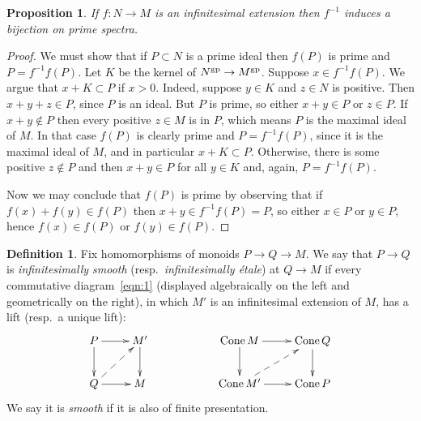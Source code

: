 \documentclass[12pt]{amsart}
\newtheorem{proposition}[theorem]{Proposition}
\theoremstyle{definition}
\newtheorem{definition}[theorem]{Definition}
\theoremstyle{remark}
\def\Cone{\operatorname{Cone}}
\begin{document}
\begin{proposition} \label{prop:spectra}
If $f : N \to M$ is an infinitesimal extension then $f^{-1}$ induces a bijection on prime spectra.
\end{proposition}
\begin{proof}
We must show that if $P \subset N$ is a prime ideal then $f(P)$ is prime and $P = f^{-1} f(P)$.  Let $K$ be the kernel of $N^{\rm gp} \to M^{\rm gp}$.  Suppose $x \in f^{-1} f(P)$.  We argue that $x + K \subset P$ if $x > 0$.  Indeed, suppose $y \in K$ and $z \in N$ is positive.  Then $x + y + z \in P$, since $P$ is an ideal.  But $P$ is prime, so either $x + y \in P$ or $z \in P$.  If $x + y \not\in P$ then every positive $z \in M$ is in $P$, which means $P$ is the maximal ideal of $M$.  In that case $f(P)$ is clearly prime and $P = f^{-1} f(P)$, since it is the maximal ideal of $M$, and in particular $x + K \subset P$.  Otherwise, there is some positive $z \not\in P$ and then $x + y \in P$ for all $y \in K$ and, again, $P = f^{-1} f(P)$.

Now we may conclude that $f(P)$ is prime by observing that if $f(x) + f(y) \in f(P)$ then $x + y \in f^{-1} f(P) = P$, so either $x \in P$ or $y \in P$, hence $f(x) \in f(P)$ or $f(y) \in f(P)$.
\end{proof}

\begin{definition}
Fix homomorphisms of monoids $P \to Q \to M$.  We say that $P \to Q$ is \emph{infinitesimally smooth} (resp.\ \emph{infinitesimally \'etale}) at $Q \to M$ if every commutative diagram~\eqref{eqn:1} (displayed algebraically on the left and geometrically on the right), in which $M'$ is an infinitesimal extension of $M$, has a lift (resp.\ a unique lift):
\begin{equation} \label{eqn:1} {\xymatrix{
P \ar[r] \ar[d] & M' \ar[d] \\
Q \ar[r] \ar@{-->}[ur] & M
} \hskip2cm \xymatrix{
\Cone M \ar[r] \ar[d] & \Cone Q \ar[d] \\
\Cone M' \ar@{-->}[ur] \ar[r] & \Cone P
}} \end{equation}
We say it is \emph{smooth} if it is also of finite presentation.
\end{definition}
\end{document}
